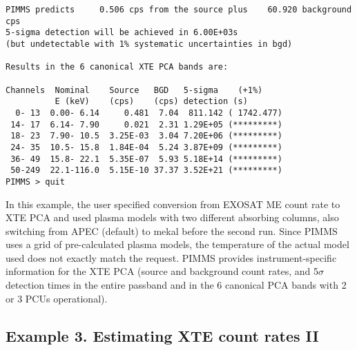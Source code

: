 \documentclass[11pt]{article}
\begin{document}
\begin{verbatim}
PIMMS predicts     0.506 cps from the source plus    60.920 background cps
5-sigma detection will be achieved in 6.00E+03s
(but undetectable with 1% systematic uncertainties in bgd)

Results in the 6 canonical XTE PCA bands are:

Channels  Nominal    Source   BGD   5-sigma    (+1%)
          E (keV)    (cps)    (cps) detection (s)
  0- 13  0.00- 6.14     0.481  7.04  811.142 ( 1742.477)
 14- 17  6.14- 7.90     0.021  2.31 1.29E+05 (*********)
 18- 23  7.90- 10.5  3.25E-03  3.04 7.20E+06 (*********)
 24- 35  10.5- 15.8  1.84E-04  5.24 3.87E+09 (*********)
 36- 49  15.8- 22.1  5.35E-07  5.93 5.18E+14 (*********)
 50-249  22.1-116.0  5.15E-10 37.37 3.52E+21 (*********)
PIMMS > quit
\end{verbatim}

In this example, the user specified conversion from EXOSAT ME count
rate to XTE PCA and used plasma models with two different absorbing
columns, also switching from APEC (default) to mekal before the second
run.  Since PIMMS uses a grid of pre-calculated plasma models, the temperature
of the actual model used does not exactly match the request.
PIMMS provides instrument-specific information for the
XTE PCA (source and background count rates, and 5$\sigma$ detection times
in the entire passband and in the 6 canonical PCA bands with 2 or 3 PCUs
operational).

\subsection*{Example 3. Estimating XTE count rates II}
\end{document}
